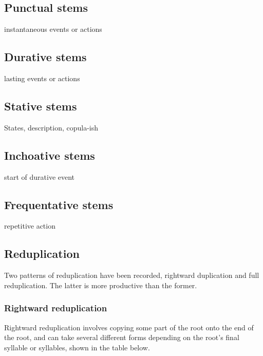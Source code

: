 \documentclass[smallroyalvopaper,9pt]{memoir}
\begin{document}
\subsection{Punctual stems}

instantaneous events or actions

\subsection{Durative stems}

lasting events or actions

\subsection{Stative stems}

States, description, copula-ish

\subsection{Inchoative stems}

start of durative event

\subsection{Frequentative stems}

repetitive action

\subsection{Reduplication}

Two patterns of reduplication have been recorded, rightward duplication and full reduplication. The latter is more productive than the former.

\subsubsection{Rightward reduplication}

Rightward reduplication involves copying some part of the root onto the end of the root, and can take several different forms depending on the root's final syllable or syllables, shown in the table below.
\end{document}
